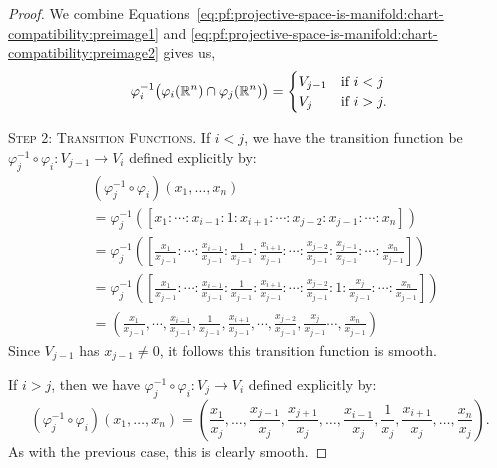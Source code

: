 \begin{proof}
We combine
Equations~\eqref{eq:pf:projective-space-is-manifold:chart-compatibility:preimage1}
and \eqref{eq:pf:projective-space-is-manifold:chart-compatibility:preimage2}
gives us,
\begin{equation}
  \varphi_{i}^{-1}\bigl(\varphi_{i}(\mathbb{R}^{n})\cap\varphi_{j}(\mathbb{R}^{n})\bigr)=\begin{cases}
  V_{j-1} & \mbox{if } i < j\\
  V_{j}  & \mbox{if } i > j.
  \end{cases}
\end{equation}

\textsc{Step 2: Transition Functions.}
If $i<j$, we have the transition function be
$\varphi_{j}^{-1}\circ\varphi_{i}\colon V_{j-1}\to V_{i}$ defined
explicitly by:
\begin{subequations}
\begin{align}
&(\varphi_{j}^{-1}\circ\varphi_{i})(x_{1},\dots,x_{n})\nonumber\\
&=\varphi_{j}^{-1}([x_{1} : \cdots : x_{i-1} : 1 : x_{i+1} : \cdots : x_{j-2} : x_{j-1} : \cdots : x_{n}])\\
&=\varphi_{j}^{-1}\left(\left[\frac{x_{1}}{x_{j-1}} : \cdots :
    \frac{x_{i-1}}{x_{j-1}} : \frac{1}{x_{j-1}} : \frac{x_{i+1}}{x_{j-1}} : \cdots : \frac{x_{j-2}}{x_{j-1}} : \frac{x_{j-1}}{x_{j-1}} : \cdots : \frac{x_{n}}{x_{j-1}}
    \right]\right)\\
&=\varphi_{j}^{-1}\left(\left[\frac{x_{1}}{x_{j-1}} : \cdots :
    \frac{x_{i-1}}{x_{j-1}} : \frac{1}{x_{j-1}} : \frac{x_{i+1}}{x_{j-1}} : \cdots : \frac{x_{j-2}}{x_{j-1}} : 1 : \frac{x_{j}}{x_{j-1}} :\cdots : \frac{x_{n}}{x_{j-1}}
    \right]\right)\\
&= \left(\frac{x_{1}}{x_{j-1}}, \cdots,
    \frac{x_{i-1}}{x_{j-1}}, \frac{1}{x_{j-1}}, \frac{x_{i+1}}{x_{j-1}}, \cdots, \frac{x_{j-2}}{x_{j-1}}, \frac{x_{j}}{x_{j-1}}\cdots, \frac{x_{n}}{x_{j-1}}\right)
\end{align}
\end{subequations}
Since $V_{j-1}$ has $x_{j-1}\neq0$, it follows this transition function
is smooth.

If $i>j$, then we have
$\varphi_{j}^{-1}\circ\varphi_{i}\colon V_{j}\to V_{i}$ defined
explicitly by:
\begin{equation}
(\varphi_{j}^{-1}\circ\varphi_{i})(x_{1},\dots,x_{n})
= \left(\frac{x_{1}}{x_{j}}, \dots,
\frac{x_{j-1}}{x_{j}}, \frac{x_{j+1}}{x_{j}},
\dots,
\frac{x_{i-1}}{x_{j}}, \frac{1}{x_{j}}, \frac{x_{i+1}}{x_{j}},
\dots,
\frac{x_{n}}{x_{j}}\right).
\end{equation}
As with the previous case, this is clearly smooth.


\end{proof}
